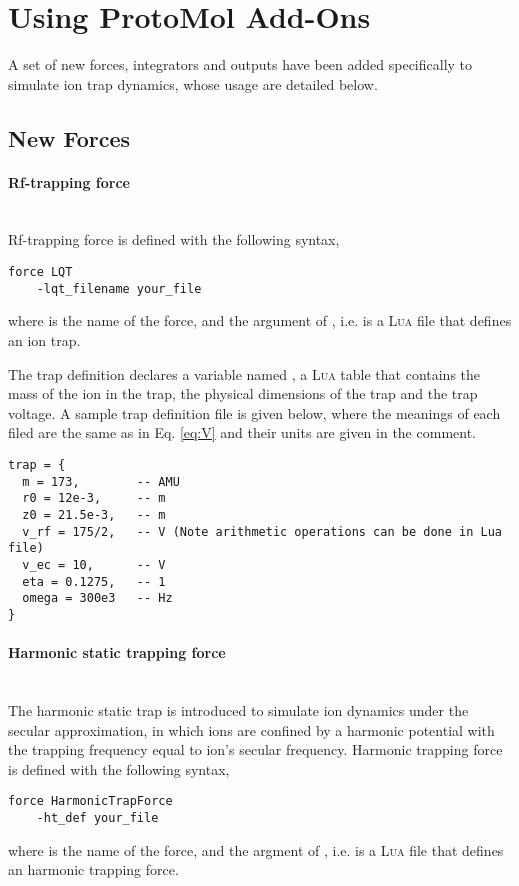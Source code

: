 \documentclass[10pt,a4paper]{article}
\begin{document}
\section{Using ProtoMol Add-Ons}
A set of new forces, integrators and outputs have been added specifically to simulate ion trap dynamics, whose usage are detailed below.

\subsection{New Forces}
\paragraph{Rf-trapping force} \mbox{} \\
Rf-trapping force is defined with the following syntax,
\begin{lstlisting}
force LQT 
    -lqt_filename your_file
\end{lstlisting}
where {} is the name of the force, and the argument of {}, i.e. {} is a \textsc{Lua} file that defines an ion trap. 

The trap definition declares a variable named {}, a \textsc{Lua} table that contains the mass of the ion in the trap, the physical dimensions of the trap and the trap voltage. A sample trap definition file is given below, where the meanings of each filed are the same as in Eq. \ref{eq:V} and their units are given in the comment.
\begin{lstlisting}
trap = { 
  m = 173,        -- AMU
  r0 = 12e-3,     -- m
  z0 = 21.5e-3,   -- m
  v_rf = 175/2,   -- V (Note arithmetic operations can be done in Lua file)
  v_ec = 10,      -- V
  eta = 0.1275,   -- 1
  omega = 300e3   -- Hz
}
\end{lstlisting}


\paragraph{Harmonic static trapping force}\mbox{} \\
The harmonic static trap is introduced to simulate ion dynamics under the secular approximation, in which ions are confined by a harmonic potential with the trapping frequency equal to ion's secular frequency. Harmonic trapping force is defined with the following syntax,
\begin{lstlisting}
force HarmonicTrapForce
    -ht_def your_file
\end{lstlisting}
where {} is the name of the force, and the argment of {}, i.e. {} is a \textsc{Lua} file that defines an harmonic trapping force. 
\end{document}
